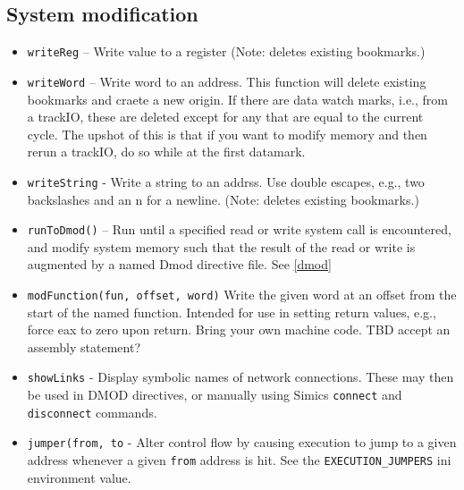 \documentclass[titlepage]{article}
\begin{document}
\subsection{System modification}
\label{sec:modification}
\begin{itemize}

\item {\tt writeReg} – Write value to a register (Note: deletes existing bookmarks.)
\item {\tt writeWord} – Write word to an address. This function will delete existing bookmarks and craete a new origin.  If there are data watch marks,
i.e., from a trackIO, these are deleted except for any that are equal to the current cycle.  The upshot of this is that if you want to modify memory
and then rerun a trackIO, do so while at the first datamark.
\item {\tt writeString} - Write a string to an addrss. Use double escapes, e.g., two backslashes and an n for a newline. (Note: deletes existing bookmarks.)

\item {\tt runToDmod()} – Run until a specified read or write system call is encountered, and modify system memory such
that the result of the read or write is augmented by a named Dmod directive file.  See \ref{dmod}

\item {\tt modFunction(fun, offset, word)} Write the given word at an offset from the start of the named function.  Intended for use in setting return
values, e.g., force eax to zero upon return.  Bring your own machine code.  TBD accept an assembly statement?

\item {\tt showLinks} - Display symbolic names of network connections.  These may then be used in DMOD directives, or manually using Simics {\tt connect}
and {\tt disconnect} commands.

\item {\tt jumper(from, to} - Alter control flow by causing execution to jump to a given address whenever a given {\tt from} address is hit.  See
the {\tt EXECUTION\_JUMPERS} ini environment value.

\end{itemize}
\end{document}
